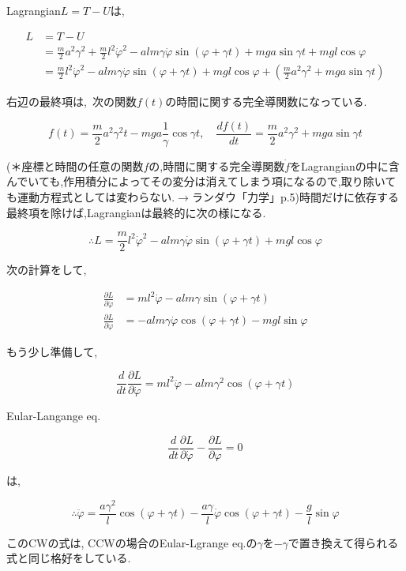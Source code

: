 Lagrangian$L=T-U$は,

\begin{align*}
   L&=T-U\\&=\displaystyle\frac{m}{2}a^2\gamma^2 + \frac{m}{2}l^2\dot{\varphi}^2 - alm\gamma\dot{\varphi}\sin(\varphi+\gamma t) + mga\sin\gamma t + mgl\cos\varphi\\
   &=\frac{m}{2}l^2\dot{\varphi}^2 - alm\gamma\dot{\varphi}\sin(\varphi+\gamma t) + mgl\cos\varphi +\left(\frac{m}{2}a^2\gamma^2 + mga\sin\gamma t\right)
\end{align*}

右辺の最終項は, 次の関数$f(t)$の時間に関する完全導関数になっている.

\[f(t)=\displaystyle\frac{m}{2}a^2\gamma^2t - mga\frac{1}{\gamma}\cos\gamma t,\quad\frac{df(t)}{dt}=\frac{m}{2}a^2\gamma^2+mga\sin\gamma t\]

(＊座標と時間の任意の関数$f$の,時間に関する完全導関数$\dot{f}$をLagrangianの中に含んでいても,作用積分によってその変分は消えてしまう項になるので,取り除いても運動方程式としては変わらない.$\rightarrow$ランダウ「力学」p.5)時間だけに依存する最終項を除けば,Lagrangianは最終的に次の様になる.

\[\therefore L=\displaystyle\frac{m}{2}l^2\dot{\varphi}^2 - alm\gamma\dot{\varphi}\sin(\varphi+\gamma t)+mgl\cos\varphi\]

次の計算をして,

\begin{align*}
   \displaystyle\frac{\partial L}{\partial\dot{\varphi}}&=ml^2\dot{\varphi} - alm\gamma\sin(\varphi+\gamma t)\\
   \displaystyle\frac{\partial L}{\partial\varphi}&=-alm\gamma\dot{\varphi}\cos(\varphi+\gamma t)- mgl\sin\varphi
\end{align*}

もう少し準備して,

\[\displaystyle\frac{d}{dt}\frac{\partial L}{\partial\dot{\varphi}}=ml^2\ddot{\varphi}-alm\gamma^2\cos(\varphi+\gamma t)\]

Eular-Langange eq.

\[\displaystyle\frac{d}{dt}\frac{\partial L}{\partial\dot{\varphi}}-\frac{\partial L}{\partial\varphi}=0\]

は,

\[\therefore \ddot{\varphi}=\displaystyle\frac{a\gamma^2}{l}\cos(\varphi+\gamma t)-\frac{a\gamma}{l}\dot{\varphi}\cos(\varphi+\gamma t)-\frac{g}{l}\sin\varphi\]

このCWの式は, CCWの場合のEular-Lgrange eq.の$\gamma$を$-\gamma$で置き換えて得られる式と同じ格好をしている.

